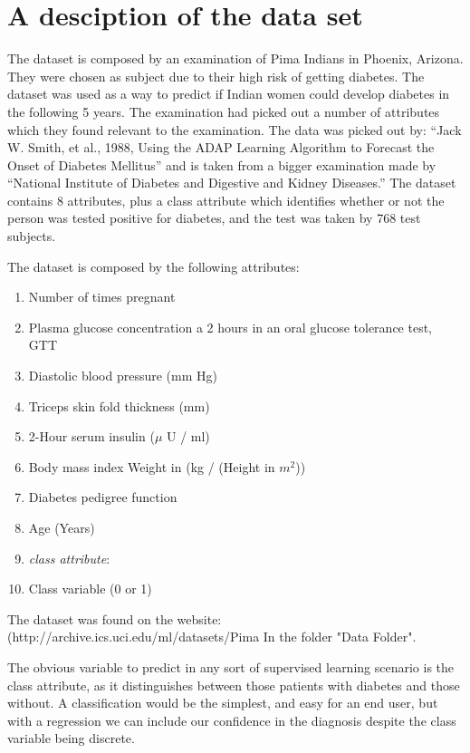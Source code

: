 \section{A desciption of the data set}

The dataset is composed by an examination of Pima Indians in Phoenix, Arizona.
They were chosen as subject due to their high risk of getting diabetes.
The dataset was used as a way to predict if Indian women could develop diabetes in the following 5 years.
The examination had picked out a number of attributes which they found relevant to the examination.
The data was picked out by: “Jack W. Smith, et al., 1988, Using the ADAP Learning Algorithm to Forecast the Onset of Diabetes Mellitus”
and is taken from a bigger examination made by “National Institute of Diabetes and Digestive and Kidney Diseases.”
The dataset contains 8 attributes, plus a class attribute which identifies whether or not the person was tested positive for diabetes,
 and the test was taken by 768 test subjects.

The dataset is composed by the following attributes:
\begin{enumerate}
\item Number of times pregnant
\item Plasma glucose concentration a 2 hours in an oral glucose tolerance test, GTT
\item Diastolic blood pressure (mm Hg)
\item Triceps skin fold thickness (mm)
\item 2-Hour serum insulin ($\mu$ U / ml)
\item Body mass index Weight in (kg / (Height in $m^2$))
\item Diabetes pedigree function
\item Age (Years)

\item \emph{class attribute}:
\item Class variable (0 or 1)
\end{enumerate}


The dataset was found on the website: (http://archive.ics.uci.edu/ml/datasets/Pima%
In the folder "Data Folder".

The obvious variable to predict
in any sort of supervised learning scenario
is the class attribute,
as it distinguishes between
those patients with diabetes and those without.
A classification would be the simplest,
and easy for an end user,
but with a regression
we can include our confidence in the diagnosis
despite the class variable being discrete.

